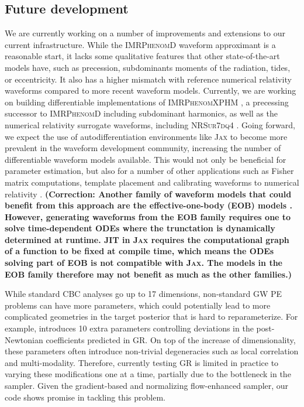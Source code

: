 \documentclass[twocolumn]{aastex631}
\newcommand{\corr}[1]{\textbf{\color{pyRed}(Correction: #1)}}
\begin{document}
\subsection{Future development}

We are currently working on a number of improvements and extensions to our
current infrastructure. While the \textsc{IMRPhenomD} waveform approximant is a
reasonable start, it lacks some qualitative features that other state-of-the-art
models have, such as precession, subdominants moments of the radiation, tides,
or eccentricity. It also has a higher mismatch with reference numerical
relativity waveforms compared to more recent waveform models. Currently, we are
working on building differentiable implementations of \textsc{IMRPhenomXPHM}
\citep{Pratten:2020ceb}, a precessing successor to \textsc{IMRPhenomD} including
subdominant harmonics, as well as the numerical relativity surrogate waveforms,
including \textsc{NRSur7dq4} \citep{Varma:2018mmi}. Going forward, we expect the
use of autodifferentiation environments like \textsc{Jax} to become more
prevalent in the waveform development community, increasing the number of
differentiable waveform models available. This would not only be beneficial for
parameter estimation, but also for a number of other applications such as Fisher
matrix computations, template placement and calibrating waveforms to numerical
relativity
\citep{Coogan:2022qxs,Iacovelli:2022bbs,Iacovelli:2022mbg,Edwards:2023sak}.
\corr{Another family of waveform models that could benefit from this approach are
the effective-one-body (EOB) models \citep{Buonanno:1998gg,PhysRevD.89.061502}.
However, generating waveforms from the EOB family requires one to solve time-dependent
ODEs where the trunctation is dynamically determined at runtime.
JIT in \textsc{Jax} requires the computational graph of a function to be fixed
at compile time, which means the ODEs solving part of EOB is not compatible with
\textsc{Jax}. The models in the EOB family therefore may not benefit as much as the
other families.}


While standard CBC analyses go up to 17 dimensions, non-standard GW PE problems
can have more parameters, which could potentially lead to more complicated
geometries in the target posterior that is hard to reparameterize. For example,
\cite{LIGOScientific:2021sio} introduces 10 extra parameters controlling
deviations in the post-Newtonian coefficients predicted in GR. On top of the
increase of dimensionality, these parameters often introduce non-trivial
degeneracies such as local correlation and multi-modality. Therefore, currently
testing GR is limited in practice to varying these modifications one at a time,
partially due to the bottleneck in the sampler.  Given the gradient-based and
normalizing flow-enhanced sampler, our code shows promise in tackling this
problem.
\end{document}
